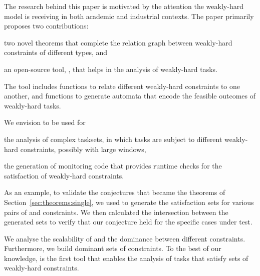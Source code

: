 The research behind this paper is motivated by the attention the weakly-hard model is receiving in both academic and industrial contexts.
The paper primarily proposes two contributions:
\begin{enumerate*}[label=(\roman*)]
    \item two novel theorems that complete the relation graph between weakly-hard constraints of different types, and 
    \item an open-source tool, \tool{}, that helps in the analysis of weakly-hard tasks. 
\end{enumerate*}
The tool includes functions to relate different weakly-hard constraints to one another, and functions to generate automata that encode the feasible outcomes of weakly-hard tasks.

We envision \tool{} to be used for
\begin{enumerate*}[label=(\roman*)]
    \item the analysis of complex tasksets, in which tasks are subject to different weakly-hard constraints, possibly with large windows,
    \item the generation of monitoring code that provides runtime checks for the satisfaction of weakly-hard constraints.
\end{enumerate*}
As an example, to validate the conjectures that became the theorems of Section~\ref{sec:theorems:single}, we used \tool{} to generate the satisfaction sets for various pairs of \tAH{} and \tRH{} constraints. 
We then calculated the intersection between the generated sets to verify that our conjecture held for the specific cases under test.

We analyse the scalability of \tool{} and the dominance between different constraints.
Furthermore, we build dominant sets of constraints.
To the best of our knowledge, \tool{} is the first tool that enables the analysis of tasks that satisfy sets of weakly-hard constraints.
